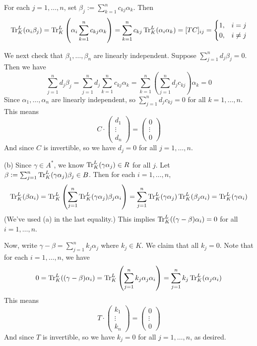 \documentclass[../Marcus.tex]{subfiles}
\begin{document}
For each $j=1,\ldots,n$, set $\beta_j:=\sum_{k=1}^n c_{kj}\alpha_k$. Then
$$
	\operatorname{Tr}^L_K(\alpha_i\beta_j)
	= \operatorname{Tr}^L_K \left(\alpha_i \sum_{k=1}^n c_{kj}\alpha_k \right)
	= \sum_{k=1}^n c_{kj} \operatorname{Tr}^L_K(\alpha_i\alpha_k) = [TC]_{ij}
	= \begin{cases}
		1, & i=j \\
		0, & i\neq j
	  \end{cases}
$$

We next check that $\beta_1,\ldots,\beta_n$ are linearly independent. Suppose $\sum_{j=1}^n d_j\beta_j = 0$. Then we have
$$
\sum_{j=1}^n d_j\beta_j
= \sum_{j=1}^n d_j \sum_{k=1}^n c_{kj}\alpha_k
=  \sum_{k=1}^n \left( \sum_{j=1}^n d_j c_{kj} \right) \alpha_k
= 0
$$
Since $\alpha_1,\ldots,\alpha_n$ are linearly independent, so $\sum_{j=1}^n d_j c_{kj} = 0$ for all $k=1,\ldots,n$. This means
$$
C \cdot
\begin{pmatrix}
    d_1 \\
    \vdots \\
    d_n
\end{pmatrix}
=
\begin{pmatrix}
    0 \\
    \vdots \\
    0
\end{pmatrix}
$$
And since $C$ is invertible, so we have $d_j=0$ for all $j=1,\ldots,n$.

(b) Since $\gamma \in A^*$, we know $\operatorname{Tr}^L_K(\gamma\alpha_j) \in R$ for all $j$. Let $\beta:=\sum_{j=1}^n \operatorname{Tr}^L_K(\gamma\alpha_j)\beta_j \in B$. Then for each $i=1,\ldots,n$,
$$
\operatorname{Tr}^L_K(\beta\alpha_i)
= \operatorname{Tr}^L_K \left( \sum_{j=1}^n \operatorname{Tr}^L_K(\gamma\alpha_j) \beta_j \alpha_i \right)
= \sum_{j=1}^n \operatorname{Tr}^L_K(\gamma\alpha_j) \operatorname{Tr}^L_K(\beta_j \alpha_i )
= \operatorname{Tr}^L_K(\gamma\alpha_i)
$$
(We've used (a) in the last equality.) This implies $\operatorname{Tr}^L_K((\gamma-\beta)\alpha_i) = 0$ for all $i=1,\ldots,n$.

Now, write $\gamma-\beta = \sum_{j=1}^n k_j\alpha_j$ where $k_j\in K$. We claim that all $k_j=0$. Note that for each $i=1,\ldots,n$, we have
$$
0
= \operatorname{Tr}^L_K((\gamma-\beta)\alpha_i)
=  \operatorname{Tr}^L_K \left(\sum_{j=1}^n k_j\alpha_j \alpha_i\right)
= \sum_{j=1}^n k_j \operatorname{Tr}^L_K(\alpha_j\alpha_i)
$$
This means
$$
T \cdot
\begin{pmatrix}
    k_1 \\
    \vdots \\
    k_n
\end{pmatrix}
=
\begin{pmatrix}
    0 \\
    \vdots \\
    0
\end{pmatrix}
$$
And since $T$ is invertible, so we have $k_j=0$ for all $j=1,\ldots,n$, as desired.
\end{document}
